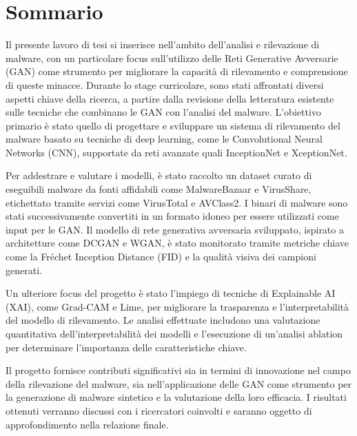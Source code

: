 \cleardoublepage
{}
{}
\begingroup
\let\clearpage\relax
\let\cleardoublepage\relax
\vspace*{-50pt}
\chapter*{Sommario}
\vspace*{-10pt}
Il presente lavoro di tesi si inserisce nell'ambito dell'analisi e rilevazione di malware, con un particolare focus sull'utilizzo delle Reti Generative Avversarie (GAN) come strumento per migliorare la capacità di rilevamento e comprensione di queste minacce. Durante lo stage curricolare, sono stati affrontati diversi aspetti chiave della ricerca, a partire dalla revisione della letteratura esistente sulle tecniche che combinano le GAN con l'analisi del malware. L'obiettivo primario è stato quello di progettare e sviluppare un sistema di rilevamento del malware basato su tecniche di deep learning, come le Convolutional Neural Networks (CNN), supportate da reti avanzate quali InceptionNet e XceptionNet.

Per addestrare e valutare i modelli, è stato raccolto un dataset curato di eseguibili malware da fonti affidabili come MalwareBazaar e VirusShare, etichettato tramite servizi come VirusTotal e AVClass2. I binari di malware sono stati successivamente convertiti in un formato idoneo per essere utilizzati come input per le GAN. Il modello di rete generativa avversaria sviluppato, ispirato a architetture come DCGAN e WGAN, è stato monitorato tramite metriche chiave come la Fréchet Inception Distance (FID) e la qualità visiva dei campioni generati.

Un ulteriore focus del progetto è stato l’impiego di tecniche di Explainable AI (XAI), come Grad-CAM e Lime, per migliorare la trasparenza e l’interpretabilità del modello di rilevamento. Le analisi effettuate includono una valutazione quantitativa dell'interpretabilità dei modelli e l'esecuzione di un'analisi ablation per determinare l'importanza delle caratteristiche chiave.

Il progetto fornisce contributi significativi sia in termini di innovazione nel campo della rilevazione del malware, sia nell'applicazione delle GAN come strumento per la generazione di malware sintetico e la valutazione della loro efficacia. I risultati ottenuti verranno discussi con i ricercatori coinvolti e saranno oggetto di approfondimento nella relazione finale.

\endgroup

